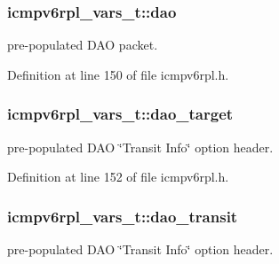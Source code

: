 \subsubsection[{\texorpdfstring{dao}{dao}}]{ icmpv6rpl\+\_\+vars\+\_\+t\+::dao}\hypertarget{structicmpv6rpl__vars__t_ad908f36fc296bb65822d7839442a3bf2}{}\label{structicmpv6rpl__vars__t_ad908f36fc296bb65822d7839442a3bf2}


pre-\/populated D\+AO packet. 



Definition at line 150 of file icmpv6rpl.\+h.

\subsubsection[{\texorpdfstring{dao\+\_\+target}{dao_target}}]{ icmpv6rpl\+\_\+vars\+\_\+t\+::dao\+\_\+target}\hypertarget{structicmpv6rpl__vars__t_a0b59a4a59a1bd42737edc57f72d54d9d}{}\label{structicmpv6rpl__vars__t_a0b59a4a59a1bd42737edc57f72d54d9d}


pre-\/populated D\+AO \char`\"{}\+Transit Info\char`\"{} option header. 



Definition at line 152 of file icmpv6rpl.\+h.

\subsubsection[{\texorpdfstring{dao\+\_\+transit}{dao_transit}}]{ icmpv6rpl\+\_\+vars\+\_\+t\+::dao\+\_\+transit}\hypertarget{structicmpv6rpl__vars__t_a8b709cb69b8a35bacb1f4b21def1e7cb}{}\label{structicmpv6rpl__vars__t_a8b709cb69b8a35bacb1f4b21def1e7cb}


pre-\/populated D\+AO \char`\"{}\+Transit Info\char`\"{} option header. 




